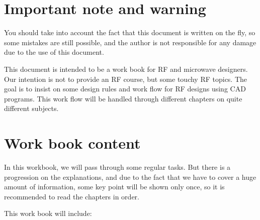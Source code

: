 %
%
%
%


\section*{Important note and warning}

You should take into account the fact that this document is written on
the fly, so some mistakes are still possible, and the author is not
responsible for any damage due to the use of this document.

\bigskip

This document is intended to be a work book for RF and microwave
designers.  Our intention is not to provide an RF course, but some
touchy RF topics.  The goal is to insist on some design rules and work
flow for RF designs using CAD programs.  This work flow will be
handled through different chapters on quite different subjects.

\section*{Work book content}

In this workbook, we will pass through some regular tasks.  But there
is a progression on the explanations, and due to the fact that we have
to cover a huge amount of information, some key point will be shown
only once, so it is recommended to read the chapters in order.

\bigskip

This work book will include:

